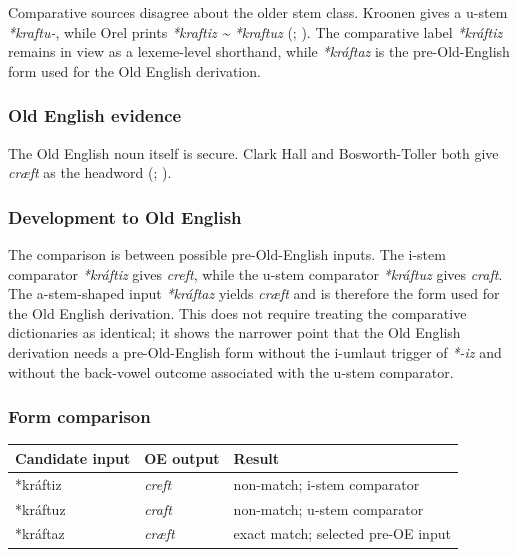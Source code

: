 \documentclass[
  british,
  a4paper,
]{article}
\newcounter{none} %
\begin{document}
Comparative sources disagree about the older stem class. Kroonen gives a
u-stem \emph{*kraftu-}, while Orel prints \emph{*kraftiz
\textasciitilde{} *kraftuz} (; ). The comparative label
\emph{*kráftiz} remains in view as a lexeme-level shorthand, while
\emph{*kráftaz} is the pre-Old-English form used for the Old English
derivation.

\subsubsection{Old English evidence}\label{old-english-evidence-2}

The Old English noun itself is secure. Clark Hall and Bosworth-Toller
both give \emph{cræft} as the headword
(;
).

\subsubsection{Development to Old
English}\label{development-to-old-english-2}

The comparison is between possible pre-Old-English inputs. The i-stem
comparator \emph{*kráftiz} gives \emph{creft}, while the u-stem
comparator \emph{*kráftuz} gives \emph{craft}. The a-stem-shaped input
\emph{*kráftaz} yields \emph{cræft} and is therefore the form used for
the Old English derivation. This does not require treating the
comparative dictionaries as identical; it shows the narrower point that
the Old English derivation needs a pre-Old-English form without the
i-umlaut trigger of \emph{*-iz} and without the back-vowel outcome
associated with the u-stem comparator.

\subsubsection{Form comparison}\label{form-comparison}

{\def\LTcaptype{none} %
\begin{longtable}[]{@{}lll@{}}
\toprule\noalign{}
Candidate input & OE output & Result \\
\midrule\noalign{}
\endhead
\bottomrule\noalign{}
\endlastfoot
*kráftiz & \emph{creft} & non-match; i-stem comparator \\
*kráftuz & \emph{craft} & non-match; u-stem comparator \\
*kráftaz & \emph{cræft} & exact match; selected pre-OE input \\
\end{longtable}
}
\end{document}
